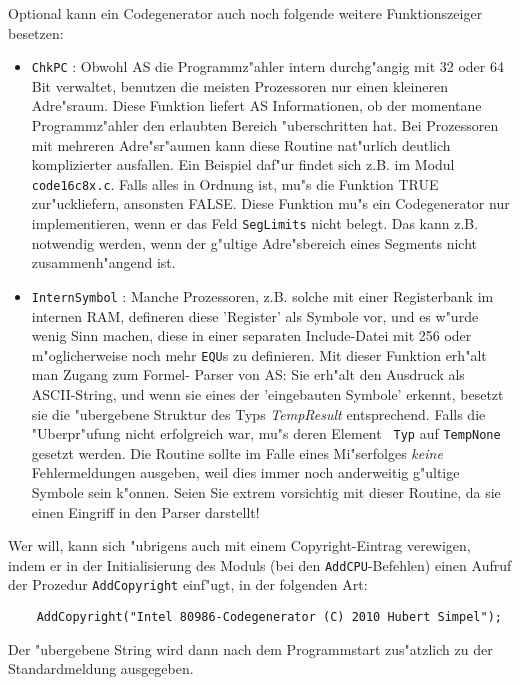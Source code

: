 \documentclass[12pt,a4paper,twoside]{report}
\newcommand{\tty}[1]{{\tt #1}}
\begin{document}
Optional kann ein Codegenerator auch noch folgende weitere Funktionszeiger
besetzen:
\begin{itemize}
\item{\tty{ChkPC} : Obwohl AS die Programmz"ahler intern durchg"angig mit
      32 oder 64 Bit verwaltet, benutzen die meisten Prozessoren nur einen
      kleineren Adre"sraum.  Diese Funktion liefert AS Informationen, ob
      der momentane Programmz"ahler den erlaubten Bereich "uberschritten
      hat.  Bei Prozessoren mit mehreren Adre"sr"aumen kann diese Routine
      nat"urlich deutlich komplizierter ausfallen.  Ein Beispiel daf"ur
      findet sich z.B. im Modul \tty{code16c8x.c}.  Falls alles in Ordnung ist,
      mu"s die Funktion TRUE zur"uckliefern, ansonsten FALSE.
      Diese Funktion mu"s ein Codegenerator nur implementieren, wenn er
      das Feld {\tt SegLimits} nicht belegt.  Das kann z.B. notwendig
      werden, wenn der g"ultige Adre"sbereich eines Segments nicht
      zusammenh"angend ist.}
\item{\tty{InternSymbol} : Manche Prozessoren, z.B. solche mit einer
      Registerbank im internen RAM, defineren diese 'Register' als Symbole
      vor, und es w"urde wenig Sinn machen, diese in einer separaten
      Include-Datei mit 256 oder m"oglicherweise noch mehr {\tt EQU}s
      zu definieren.  Mit dieser Funktion erh"alt man Zugang zum Formel-
      Parser von AS: Sie erh"alt den Ausdruck als ASCII-String, und wenn
      sie eines der 'eingebauten Symbole' erkennt, besetzt sie die
      "ubergebene Struktur des Typs {\em TempResult} entsprechend.  Falls
      die "Uberpr"ufung nicht erfolgreich war, mu"s deren Element {\tt
      Typ} auf {\tt TempNone} gesetzt werden.  Die Routine sollte im
      Falle eines Mi"serfolges {\em keine} Fehlermeldungen ausgeben, weil
      dies immer noch anderweitig g"ultige Symbole sein k"onnen.  Seien
      Sie extrem vorsichtig mit dieser Routine, da sie einen Eingriff in
      den Parser darstellt!}
\end{itemize}

Wer will, kann sich "ubrigens auch mit einem Copyright-Eintrag verewigen,
indem er in der Initialisierung des Moduls (bei den \tty{AddCPU}-Befehlen)
einen Aufruf der Prozedur \tty{AddCopyright} einf"ugt, in der folgenden
Art:
\begin{verbatim}
    AddCopyright("Intel 80986-Codegenerator (C) 2010 Hubert Simpel");
\end{verbatim}
Der "ubergebene String wird dann nach dem Programmstart zus"atzlich zu
der Standardmeldung ausgegeben.
\end{document}
